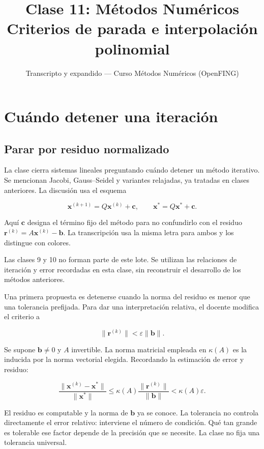 \documentclass[12pt,a4paper]{article}
\title{\textbf{Clase 11: Métodos Numéricos} \\[0.3em]
        \large{Criterios de parada e interpolación polinomial}}
\author{Transcripto y expandido --- Curso Métodos Numéricos (OpenFING)}
\date{}
\begin{document}
\maketitle
\thispagestyle{empty}
\newpage
\tableofcontents
\newpage

\section{Cuándo detener una iteración}

\subsection{Parar por residuo normalizado}

La clase cierra sistemas lineales preguntando cuándo detener un método iterativo. Se mencionan Jacobi, Gauss–Seidel y variantes relajadas, ya tratadas en clases anteriores. La discusión usa el esquema

\[
\mathbf x^{(k+1)}=Q\mathbf x^{(k)}+\mathbf c,
\qquad \mathbf x^*=Q\mathbf x^*+\mathbf c.
\]

Aquí $\mathbf c$ designa el término fijo del método para no confundirlo con el residuo $\mathbf r^{(k)}=A\mathbf x^{(k)}-\mathbf b$. La transcripción usa la misma letra para ambos y los distingue con colores.

\begin{notebox}
Las clases 9 y 10 no forman parte de este lote. Se utilizan las relaciones de iteración y error recordadas en esta clase, sin reconstruir el desarrollo de los métodos anteriores.
\end{notebox}

Una primera propuesta es detenerse cuando la norma del residuo es menor que una tolerancia prefijada. Para dar una interpretación relativa, el docente modifica el criterio a

\[
\boxed{\|\mathbf r^{(k)}\|<\varepsilon\|\mathbf b\|}.
\]

Se supone $\mathbf b\ne0$ y $A$ invertible. La norma matricial empleada en $\kappa(A)$ es la inducida por la norma vectorial elegida. Recordando la estimación de error y residuo:

\[
\frac{\|\mathbf x^{(k)}-\mathbf x^*\|}{\|\mathbf x^*\|}
\le\kappa(A)\frac{\|\mathbf r^{(k)}\|}{\|\mathbf b\|}
<\kappa(A)\varepsilon.
\]

El residuo es computable y la norma de $\mathbf b$ ya se conoce. La tolerancia no controla directamente el error relativo: interviene el número de condición. Qué tan grande es tolerable ese factor depende de la precisión que se necesite. La clase no fija una tolerancia universal.
\end{document}
